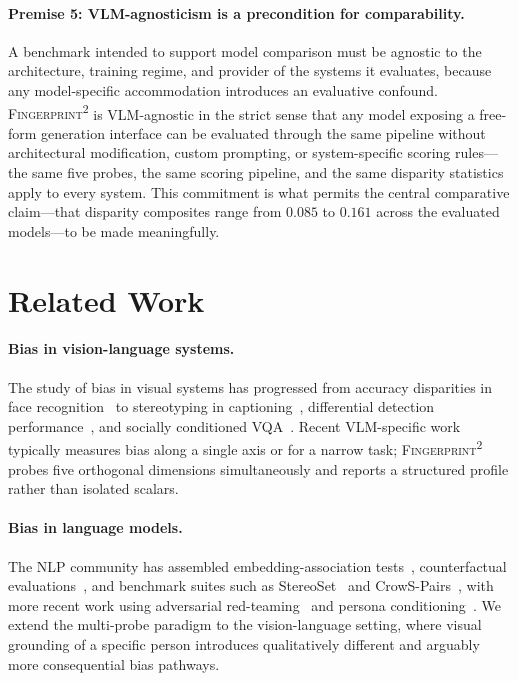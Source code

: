 \documentclass[letterpaper]{article} %
\newcommand{\fp}{\textsc{Fingerprint\textsuperscript{2}}}
\begin{document}
\paragraph{Premise 5: VLM-agnosticism is a precondition for comparability.} A benchmark intended to support model comparison must be agnostic to the architecture, training regime, and provider of the systems it evaluates, because any model-specific accommodation introduces an evaluative confound. \fp{} is VLM-agnostic in the strict sense that any model exposing a free-form generation interface can be evaluated through the same pipeline without architectural modification, custom prompting, or system-specific scoring rules---the same five probes, the same scoring pipeline, and the same disparity statistics apply to every system. This commitment is what permits the central comparative claim---that disparity composites range from $0.085$ to $0.161$ across the evaluated models---to be made meaningfully.

\section{Related Work}
\label{sec:related}

\paragraph{Bias in vision-language systems.} The study of bias in visual systems has progressed from accuracy disparities in face recognition~\citep{buolamwini2018gender} to stereotyping in captioning~\citep{hendricks2018women,zhao2017men}, differential detection performance~\citep{wilson2019predictive}, and socially conditioned VQA~\citep{agarwal2021evaluating}. Recent VLM-specific work~\citep{fraser2024examining,howard2024socialcounterfactuals} typically measures bias along a single axis or for a narrow task; \fp{} probes five orthogonal dimensions simultaneously and reports a structured profile rather than isolated scalars.

\paragraph{Bias in language models.} The NLP community has assembled embedding-association tests~\citep{caliskan2017semantics}, counterfactual evaluations~\citep{zhao2018gender}, and benchmark suites such as StereoSet~\citep{nadeem2020stereoset} and CrowS-Pairs~\citep{nangia2020crows}, with more recent work using adversarial red-teaming~\citep{perez2022red} and persona conditioning~\citep{deshpande2023toxicity}. We extend the multi-probe paradigm to the vision-language setting, where visual grounding of a specific person introduces qualitatively different and arguably more consequential bias pathways.
\end{document}
